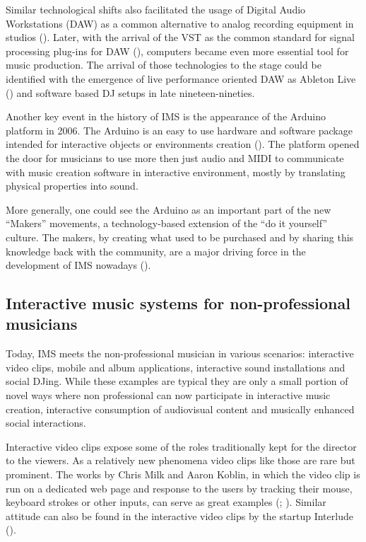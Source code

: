 \documentclass[a4paper,11pt]{article}
\begin{document}
Similar technological shifts also facilitated the usage of Digital Audio Workstations (DAW) as a common alternative to analog recording equipment in studios (\cite{leider:04}).
Later, with the arrival of the VST as the common standard for signal processing plug-ins for DAW (\citeauthor{web:steinberg}), computers became even more essential tool for music production.
The arrival of those technologies to the stage could be identified with the emergence of live performance oriented DAW as Ableton Live (\citeauthor{web:live}) and software based DJ setups in late nineteen-nineties.

Another key event in the history of IMS is the appearance of the Arduino platform in 2006.
The Arduino is an easy to use hardware and software package intended for interactive objects or environments creation (\citeauthor{web:arduino}).
The platform opened the door for musicians to use more then just audio and MIDI to communicate with music creation software in interactive environment, mostly by translating physical properties into sound.

More generally, one could see the Arduino as an important part of the new ``Makers'' movements, a technology-based extension of the ``do it yourself'' culture.
The makers, by creating what used to be purchased and by sharing this knowledge back with the community, are a major driving force in the development of IMS nowadays (\cite{web:kirn12}).

\subsection{Interactive music systems for non-professional musicians}

Today, IMS meets the non-professional musician in various scenarios: interactive video clips, mobile and album applications, interactive sound installations and social DJing.
While these examples are typical they are only a small portion of novel ways where non professional can now participate in interactive music creation, interactive consumption of audiovisual content and musically enhanced social interactions.

Interactive video clips expose some of the roles traditionally kept for the director to the viewers.
As a relatively new phenomena video clips like those are rare but prominent.
The works by Chris Milk and Aaron Koblin, in which the video clip is run on a dedicated web page and response to the users by tracking their mouse, keyboard strokes or other inputs, can serve as great examples (\citeauthor{web:milk1}; \citeauthor{web:milk2}).
Similar attitude can also be found in the interactive video clips by the startup Interlude (\citeauthor{web:interlude}).
\end{document}
